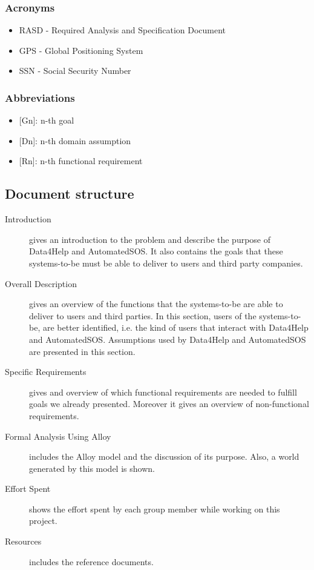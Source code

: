 \documentclass{article}
\begin{document}
\subsubsection{Acronyms}
\begin{itemize}
	\item RASD - Required Analysis and Specification Document
	\item GPS - Global Positioning System
	\item SSN - Social Security Number
\end{itemize}
\subsubsection{Abbreviations}
\begin{itemize}
	\item {[Gn]}: n-th goal
	\item {[Dn]}: n-th domain assumption
	\item {[Rn]}: n-th functional requirement
\end{itemize}
\subsection{Document structure}
\begin{description}
	\item [Introduction] gives an introduction to the problem and describe the purpose of Data4Help and AutomatedSOS. It also contains the goals that these systems-to-be must be able to deliver to users and third party companies.
	\item [Overall Description] gives an overview of the functions that the systems-to-be are able to deliver to users and third parties. In this section, users of the systems-to-be, are better identified, i.e. the kind of users that interact with Data4Help and AutomatedSOS. Assumptions used by Data4Help and AutomatedSOS are presented in this section. 
	\item [Specific Requirements] gives and overview of which functional requirements are needed to fulfill goals we already presented. Moreover it gives an overview of non-functional requirements.
	\item [Formal Analysis Using Alloy] includes the Alloy model and the discussion of its purpose. Also, a world generated by this model is shown.
	\item [Effort Spent] shows the effort spent by each group member while working on this project.
	\item [Resources] includes the reference documents. 
\end{description}
\newpage
\end{document}
